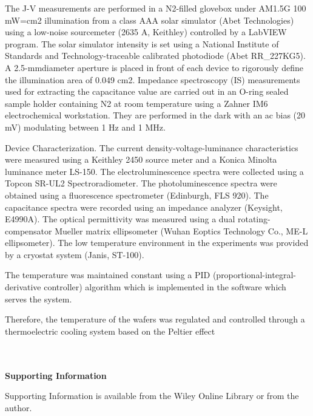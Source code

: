 \documentclass{WileyMSP-template}
\begin{document}
The J-V measurements are performed in a N2-filled
glovebox under AM1.5G 100 mW=cm2 illumination from
a class AAA solar simulator (Abet Technologies) using a
low-noise sourcemeter (2635 A, Keithley) controlled by a
LabVIEW program. The solar simulator intensity is set using a
National Institute of Standards and Technology-traceable
calibrated photodiode (Abet RR_227KG5). A 2.5-mmdiameter aperture is placed in front of each device to
rigorously define the illumination area of 0.049 cm2.
Impedance spectroscopy (IS) measurements used for
extracting the capacitance value are carried out in an O-ring
sealed sample holder containing N2 at room temperature
using a Zahner IM6 electrochemical workstation. They are
performed in the dark with an ac bias (20 mV) modulating
between 1 Hz and 1 MHz.

Device Characterization. The current density-voltage-luminance
characteristics were measured using a Keithley 2450 source meter and
a Konica Minolta luminance meter LS-150. The electroluminescence
spectra were collected using a Topcon SR-UL2 Spectroradiometer. The
photoluminescence spectra were obtained using a fluorescence spectrometer (Edinburgh, FLS 920). The capacitance spectra were recorded
using an impedance analyzer (Keysight, E4990A). The optical permittivity was measured using a dual rotating-compensator Mueller matrix
ellipsometer (Wuhan Eoptics Technology Co., ME-L ellipsometer). The
low temperature environment in the experiments was provided by a
cryostat system (Janis, ST-100).

The temperature was maintained constant using a PID (proportional-integral-derivative controller) algorithm which is implemented in the software which serves the system.

Therefore, the temperature of the
wafers was regulated and controlled through a thermoelectric
cooling system based on the Peltier effect

\\
\\



\medskip
\textbf{Supporting Information} \par %
Supporting Information is available from the Wiley Online Library or from the author.
\end{document}
